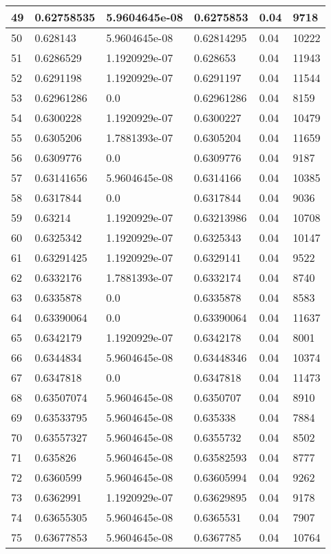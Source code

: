\begin{longtable}{|l|l|l|l|l|l|}
49 & 0.62758535 & 5.9604645e-08 & 0.6275853 & 0.04 & 9718 \\ \hline 
50 & 0.628143 & 5.9604645e-08 & 0.62814295 & 0.04 & 10222 \\ \hline 
51 & 0.6286529 & 1.1920929e-07 & 0.628653 & 0.04 & 11943 \\ \hline 
52 & 0.6291198 & 1.1920929e-07 & 0.6291197 & 0.04 & 11544 \\ \hline 
53 & 0.62961286 & 0.0 & 0.62961286 & 0.04 & 8159 \\ \hline 
54 & 0.6300228 & 1.1920929e-07 & 0.6300227 & 0.04 & 10479 \\ \hline 
55 & 0.6305206 & 1.7881393e-07 & 0.6305204 & 0.04 & 11659 \\ \hline 
56 & 0.6309776 & 0.0 & 0.6309776 & 0.04 & 9187 \\ \hline 
57 & 0.63141656 & 5.9604645e-08 & 0.6314166 & 0.04 & 10385 \\ \hline 
58 & 0.6317844 & 0.0 & 0.6317844 & 0.04 & 9036 \\ \hline 
59 & 0.63214 & 1.1920929e-07 & 0.63213986 & 0.04 & 10708 \\ \hline 
60 & 0.6325342 & 1.1920929e-07 & 0.6325343 & 0.04 & 10147 \\ \hline 
61 & 0.63291425 & 1.1920929e-07 & 0.6329141 & 0.04 & 9522 \\ \hline 
62 & 0.6332176 & 1.7881393e-07 & 0.6332174 & 0.04 & 8740 \\ \hline 
63 & 0.6335878 & 0.0 & 0.6335878 & 0.04 & 8583 \\ \hline 
64 & 0.63390064 & 0.0 & 0.63390064 & 0.04 & 11637 \\ \hline 
65 & 0.6342179 & 1.1920929e-07 & 0.6342178 & 0.04 & 8001 \\ \hline 
66 & 0.6344834 & 5.9604645e-08 & 0.63448346 & 0.04 & 10374 \\ \hline 
67 & 0.6347818 & 0.0 & 0.6347818 & 0.04 & 11473 \\ \hline 
68 & 0.63507074 & 5.9604645e-08 & 0.6350707 & 0.04 & 8910 \\ \hline 
69 & 0.63533795 & 5.9604645e-08 & 0.635338 & 0.04 & 7884 \\ \hline 
70 & 0.63557327 & 5.9604645e-08 & 0.6355732 & 0.04 & 8502 \\ \hline 
71 & 0.635826 & 5.9604645e-08 & 0.63582593 & 0.04 & 8777 \\ \hline 
72 & 0.6360599 & 5.9604645e-08 & 0.63605994 & 0.04 & 9262 \\ \hline 
73 & 0.6362991 & 1.1920929e-07 & 0.63629895 & 0.04 & 9178 \\ \hline 
74 & 0.63655305 & 5.9604645e-08 & 0.6365531 & 0.04 & 7907 \\ \hline 
75 & 0.63677853 & 5.9604645e-08 & 0.6367785 & 0.04 & 10764 \\ \hline 
\end{longtable}